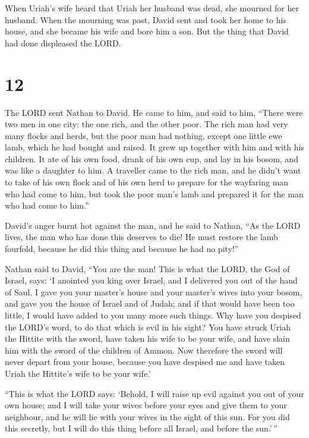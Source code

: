  When Uriah's wife heard that Uriah her husband was dead,
she mourned for her husband.  When the mourning was past,
David sent and took her home to his house, and she became his wife and
bore him a son. But the thing that David had done displeased the LORD.

\hypertarget{section-11}{%
\section{12}\label{section-11}}

 The LORD sent Nathan to David. He came to him, and said to
him, ``There were two men in one city: the one rich, and the other poor.
 The rich man had very many flocks and herds, 
but the poor man had nothing, except one little ewe lamb, which he had
bought and raised. It grew up together with him and with his children.
It ate of his own food, drank of his own cup, and lay in his bosom, and
was like a daughter to him.  A traveller came to the rich
man, and he didn't want to take of his own flock and of his own herd to
prepare for the wayfaring man who had come to him, but took the poor
man's lamb and prepared it for the man who had come to him.''

 David's anger burnt hot against the man, and he said to
Nathan, ``As the LORD lives, the man who has done this deserves to die!
 He must restore the lamb fourfold, because he did this
thing and because he had no pity!''

 Nathan said to David, ``You are the man! This is what the
LORD, the God of Israel, says: `I anointed you king over Israel, and I
delivered you out of the hand of Saul.  I gave you your
master's house and your master's wives into your bosom, and gave you the
house of Israel and of Judah; and if that would have been too little, I
would have added to you many more such things.  Why have you
despised the LORD's word, to do that which is evil in his sight? You
have struck Uriah the Hittite with the sword, have taken his wife to be
your wife, and have slain him with the sword of the children of Ammon.
 Now therefore the sword will never depart from your house,
because you have despised me and have taken Uriah the Hittite's wife to
be your wife.'

 ``This is what the LORD says: `Behold, I will raise up
evil against you out of your own house; and I will take your wives
before your eyes and give them to your neighbour, and he will lie with
your wives in the sight of this sun.  For you did this
secretly, but I will do this thing before all Israel, and before the
sun.'\,''

